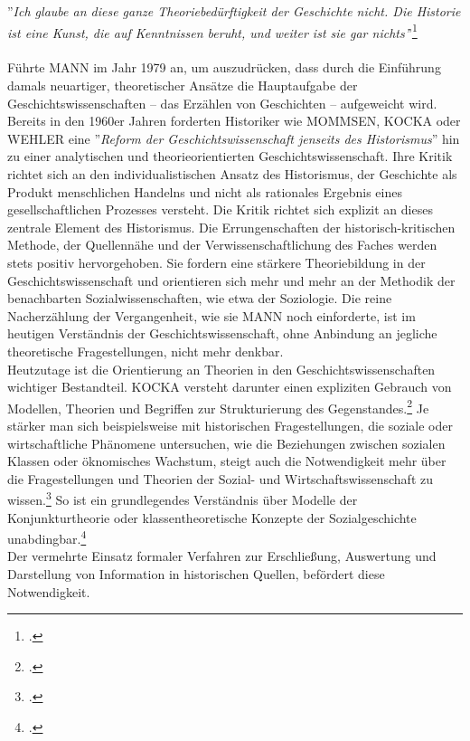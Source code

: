 \documentclass[12pt,a4paper]{article}
\begin{document}
''\textit{Ich glaube an diese ganze Theoriebedürftigkeit der Geschichte nicht. Die Historie ist eine Kunst, die auf Kenntnissen beruht, und weiter ist sie gar nichts'}'\footcite[Vgl.][S.53]{mann1979pladoyer}
\\
\\
Führte MANN im Jahr 1979 an, um auszudrücken, dass durch die Einführung damals neuartiger, theoretischer Ansätze die Hauptaufgabe der Geschichtswissenschaften --  das Erzählen von Geschichten -- aufgeweicht wird. Bereits in den 1960er Jahren forderten Historiker wie MOMMSEN, KOCKA oder WEHLER eine ''\textit{Reform der Geschichtswissenschaft jenseits des Historismus}'' hin zu einer analytischen und theorieorientierten Geschichtswissenschaft. Ihre Kritik richtet sich an den individualistischen Ansatz des Historismus, der Geschichte als Produkt menschlichen Handelns und nicht als rationales Ergebnis eines gesellschaftlichen Prozesses versteht. Die Kritik richtet sich explizit an dieses zentrale Element des Historismus. Die Errungenschaften der historisch-kritischen Methode, der Quellennähe und der Verwissenschaftlichung des Faches werden stets positiv hervorgehoben. Sie fordern eine stärkere Theoriebildung in der Geschichtswissenschaft und orientieren sich mehr und mehr an der Methodik der benachbarten Sozialwissenschaften, wie etwa der Soziologie. Die reine Nacherzählung der Vergangenheit, wie sie MANN noch einforderte, ist im heutigen Verständnis der Geschichtswissenschaft, ohne Anbindung an jegliche theoretische Fragestellungen, nicht mehr denkbar.
\\
Heutzutage ist die Orientierung an Theorien in den Geschichtswissenschaften wichtiger Bestandteil. KOCKA versteht darunter einen expliziten Gebrauch von Modellen, Theorien und Begriffen zur Strukturierung des Gegenstandes.\footcite[][S.2]{magerski2009schreibt} Je stärker man sich beispielsweise mit historischen Fragestellungen, die soziale oder wirtschaftliche Phänomene untersuchen, wie die Beziehungen zwischen sozialen Klassen oder öknomisches Wachstum, steigt auch die Notwendigkeit mehr über die Fragestellungen und Theorien der Sozial- und Wirtschaftswissenschaft zu wissen.\footcite[][S.6-8]{kocka1982theorien} So ist ein grundlegendes Verständnis über Modelle der Konjunkturtheorie oder klassentheoretische Konzepte der Sozialgeschichte unabdingbar.\footcite[][S.1]{sokollgrundlagen}
\\
Der vermehrte Einsatz formaler Verfahren zur Erschließung, Auswertung und Darstellung von Information in historischen Quellen, befördert diese Notwendigkeit.
\end{document}
